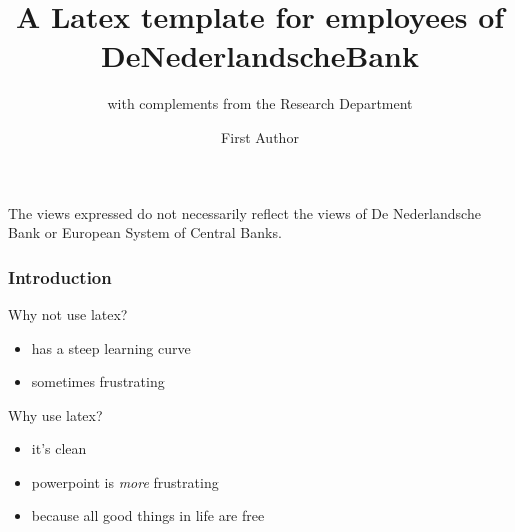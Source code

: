\documentclass{beamer}
\author{First Author}
\institute{De Nederlandsche Bank}
\title{A Latex template for employees of DeNederlandscheBank }
\subtitle{with complements from the Research Department}
\begin{document}
\begin{frame}[plain]
\maketitle
\end{frame}


\begin{frame}
The views expressed do not necessarily reflect the views of De Nederlandsche Bank or European System of Central Banks.
\end{frame}


\begin{frame}
\frametitle{Introduction}
Why not use latex?
    \begin{itemize}
    \item has a steep learning curve
    \item sometimes frustrating
    \end{itemize}
Why use latex?
    \begin{itemize}
    \item it's clean
    \item powerpoint is \emph{more} frustrating
    \item because all good things in life are free
    \end{itemize}
\end{frame}
\end{document}
